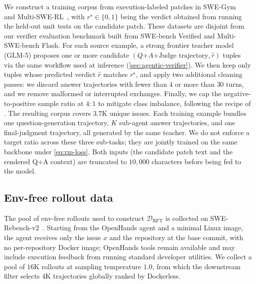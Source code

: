 \documentclass[]{arxiv_template}
\newcommand{\approach}{Dockerless\xspace}
\newcommand{\zeng}[1]{\textcolor[rgb]{1,0.66,0}{\textbf{[Zeng: #1]}}}
\begin{document}
We construct a training corpus from execution-labeled patches in SWE-Gym~\citep{pan2025training} and Multi-SWE-RL~\citep{zan2026multi}, with $r^\star \in \{0, 1\}$ being the verdict obtained from running the held-out unit tests on the candidate patch.
These datasets are disjoint from our verifier evaluation benchmark built from SWE-bench Verified and Multi-SWE-bench Flash.
For each source example, a strong frontier teacher model (GLM-5) proposes one or more candidate $(Q\text{+}A\text{+Judge trajectory}, \hat{r})$ tuples via the same workflow used at inference (\cref{sec:agentic-verifier}).
We then keep only tuples whose predicted verdict $\hat{r}$ matches $r^\star$, and apply two additional cleaning passes: we discard answer trajectories with fewer than $4$ or more than $30$ turns, and we remove malformed or interrupted exchanges.
Finally, we cap the negative-to-positive sample ratio at $4{:}1$ to mitigate class imbalance, following the recipe of \citet{shum2025swe}.
The resulting corpus covers $3.7$K unique issues.
Each training example bundles one question-generation trajectory, $K$ sub-agent answer trajectories, and one final-judgment trajectory, all generated by the same teacher.
We do not enforce a target ratio across these three sub-tasks; they are jointly trained on the same backbone under \cref{eq:rm-loss}.
Both inputs (the candidate patch text and the rendered Q+A context) are truncated to $10{,}000$ characters before being fed to the model.

\subsection{Env-free rollout data}
\label{app:data-rollout}

The pool of env-free rollouts used to construct $\mathcal{D}_{\text{RFT}}$ is collected on SWE-Rebench-v2~\citep{badertdinov2026swev2}.
Starting from the OpenHands agent and a minimal Linux image, the agent receives only the issue $x$ and the repository at the base commit, with no per-repository Docker image; OpenHands tools remain available and may include execution feedback from running standard developer utilities.
We collect a pool of $16$K rollouts at sampling temperature $1.0$, from which the downstream filter selects $4$K trajectories globally ranked by \approach.
\end{document}
